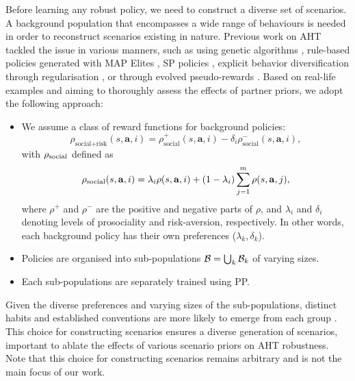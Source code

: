 Before learning any robust policy, we need to construct a diverse set of scenarios. A background population that encompasses a wide range of behaviours is needed in order to reconstruct scenarios existing in nature. Previous work on AHT tackled the issue in various manners, such as using genetic algorithms \citep{muglich_generalized_beliefs_cooperative_2022}, rule-based policies generated with MAP Elites \citep{canaan_generating_adapting_diverse_2023}, SP policies \citep{strouse_collaboration_with_humans_2021}, explicit behavior diversification through regularisation \citep{lupu_trajectory_diversity_zero_2021}, or through evolved pseudo-rewards \citep{jaderberg_human_level_performance_2019}. Based on real-life examples and aiming to thoroughly assess the effects of partner priors, we adopt the following approach:
\begin{itemize}[leftmargin=12pt]
    \item We assume a class of reward functions for background policies:
    \begin{equation*}
        \rho_\text{social+risk} (s, \mathbf{a}, i) = \rho_\text{social}^+ (s, \mathbf{a}, i) - \delta_i \rho_\text{social}^- (s, \mathbf{a}, i),
    \end{equation*}
    with $\rho_\text{social}$ defined as
    \begin{equation*}
        \rho_\text{social}(s, \mathbf{a}, i) = \lambda_i \rho(s, \mathbf{a}, i) + (1-\lambda_i) \sum_{j=1}^m \rho(s, \mathbf{a}, j),
    \end{equation*}
    where $\rho^+$ and $\rho^-$ are the positive and negative parts of $\rho$, and $\lambda_i$ and $\delta_i$ denoting levels of prosociality \citep{peysakhovich_prosocial_learning_agents_2017} and risk-aversion, respectively. In other words, each background policy has their own preferences ($\lambda_k, \delta_k$).
    \item Policies are organised into sub-populations $\mathcal{B} = \bigcup_k \mathcal{B}_k$ of varying sizes.
    \item Each sub-populations are separately trained using PP.
\end{itemize}
Given the diverse preferences and varying sizes of the sub-populations, distinct habits and established conventions are more likely to emerge from each group \cite{strouse_collaboration_with_humans_2021}. This choice for constructing scenarios ensures a diverse generation of scenarios, important to ablate the effects of various scenario priors on AHT robustness.
Note that this choice for constructing scenarios remains arbitrary and is not the main focus of our work.


